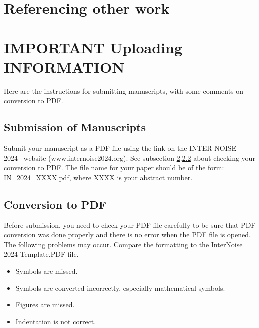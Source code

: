 \documentclass[a4paper,12pt]{article}
\newcommand{\YearConf}{2024}
\begin{document}
\section{Referencing other work}
\noindent

\cite{latexcompanion, knuthwebsite}


\section{IMPORTANT Uploading INFORMATION}
   \label{important}
\noindent
Here are the instructions for submitting manuscripts, with some comments on conversion to PDF.
\subsection{Submission of Manuscripts}
\noindent
Submit your manuscript as a PDF file using the link on the INTER-NOISE \YearConf ~ website (www.internoise\YearConf.org).  See subsection \ref{important}.\ref{conversion} about checking your conversion to PDF.
The file name for your paper should be of the form:  IN\_\YearConf\_XXXX.pdf, where XXXX is your abstract number. 

\subsection{Conversion to PDF}
  \label{conversion}
\noindent
Before submission, you need to check your PDF file carefully to be sure that PDF conversion was done properly and there is no error when the PDF file is opened. The following problems may occur.
Compare the formatting to the InterNoise 2024 Template.PDF file.
\begin{itemize}[noitemsep]
\item
Symbols are missed.
\item
Symbols are converted incorrectly, especially mathematical symbols.
\item
Figures are missed.
\item
Indentation is not correct.
\end{itemize}




 
\end{document}
